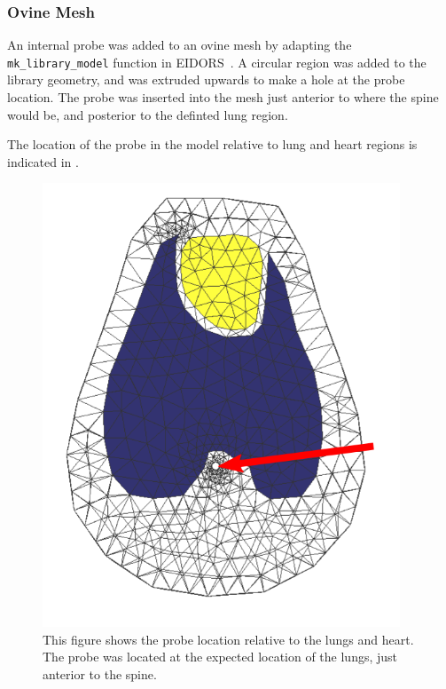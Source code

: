 \subsubsection{Ovine Mesh}
An internal probe was added to an ovine mesh by adapting the 
\verb!mk_library_model!
function in EIDORS~\parencite{adler_eidors_2017}. A circular region was added to the
library geometry, and was extruded upwards to make a hole at the probe location. 
The probe was inserted into the mesh just anterior to where the spine would be,
and posterior to the definted lung region. 

The location of the probe in the model relative to lung and heart 
regions is indicated in . 
\begin{figure}[H]
    \centering
	\includegraphics[width=0.95\textwidth]{chapter7-internal_elec_motion/imgs/internal_probe_location.png} 
	\caption[Ovine mesh with organ regions and probe placement]{\label{fig:ovine_anatomy} 
	This figure shows the probe location relative to the lungs and heart. The probe was located 
	at the expected location of the lungs, just anterior to the spine. }
\end{figure}

